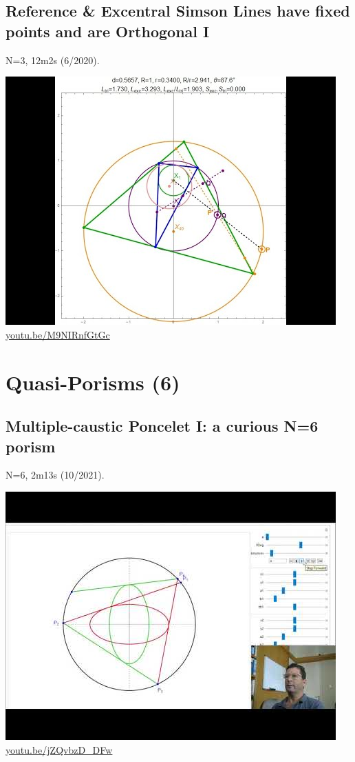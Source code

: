 \documentclass[12pt]{amsart}
\begin{document}
\subsection{Reference \& Excentral Simson Lines have fixed points and are Orthogonal I}
\label{vid:M9NIRnfGtGc}
\noindent N=3, 12m2s (6/2020). 
\begin{center}\includegraphics[width=.5\textwidth]{pics/M9NIRnfGtGc.jpg} \\ 
\href{https://youtu.be/M9NIRnfGtGc}{\url{youtu.be/M9NIRnfGtGc}}\end{center}
% 


\section{Quasi-Porisms (6)}

\subsection{Multiple-caustic Poncelet I: a curious N=6 porism}
\label{vid:jZQvbzD_DFw}
\noindent N=6, 2m13s (10/2021). 
\begin{center}\includegraphics[width=.5\textwidth]{pics/jZQvbzD_DFw.jpg} \\ 
\href{https://youtu.be/jZQvbzD_DFw}{\url{youtu.be/jZQvbzD\_DFw}}\end{center}
% 
\end{document}
